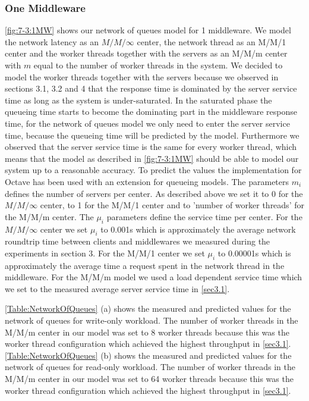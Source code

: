 \documentclass[11pt,a4paper]{article}
\begin{document}
\subsubsection{One Middleware}
\autoref{fig:7-3:1MW} shows our network of queues model for 1 middleware. We model the network latency as an $M/M/\infty$ center, the network thread as an M/M/1 center and the worker threads together with the servers as an M/M/m center with $m$ equal to the number of worker threads in the system. We decided to model the worker threads together with the servers because we observed in sections 3.1, 3.2 and 4 that the response time is dominated by the server service time as long as the system is under-saturated. In the saturated phase the queueing time starts to become the dominating part in the middleware response time, for the network of queues model we only need to enter the server service time, because the queueing time will be predicted by the model. Furthermore we observed that the server service time is the same for every worker thread, which means that the model as described in \autoref{fig:7-3:1MW} should be able to model our system up to a reasonable accuracy. To predict the values the implementation for Octave  has been used with an extension for queueing models. The parameters $m_i$ defines the number of servers per center. As described above we set it to 0 for the $M/M/\infty$ center, to 1 for the M/M/1 center and to 'number of worker threads' for the M/M/m center.
The $\mu_i$ parameters define the service time per center. For the $M/M/\infty$ center we set $\mu_i$ to 0.001s which is approximately the average network roundtrip time between clients and middlewares we measured during the experiments in section 3. For the M/M/1 center we set $\mu_i$ to 0.00001s which is approximately the average time a request spent in the network thread in the middleware.
For the M/M/m model we used a load dependent service time which we set to the measured average server service time in \autoref{sec3.1}.

\autoref{Table:NetworkOfQueues} (a) shows the measured and predicted values for the network of queues for write-only workload. The number of worker threads in the M/M/m center in our model was set to 8 worker threads because this was the worker thread configuration which achieved the highest throughput in \autoref{sec3.1}. 
\autoref{Table:NetworkOfQueues} (b) shows the measured and predicted values for the network of queues for read-only workload. The number of worker threads in the M/M/m center in our model was set to 64 worker threads because this was the worker thread configuration which achieved the highest throughput in \autoref{sec3.1}. 
\end{document}
